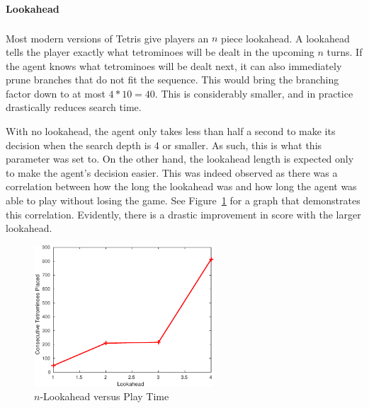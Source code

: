 \documentclass[fontsize=12pt]{article}
\def\tetris{Tetris\textsuperscript{\textregistered}}
\begin{document}
\paragraph{Lookahead}
\label{par:lookahead}
Most modern versions of \tetris{} give players an $n$ piece lookahead. A lookahead tells the player exactly what tetrominoes will be dealt in the upcoming $n$ turns. If the agent knows what tetrominoes will be dealt next, it can also immediately prune branches that do not fit the sequence. This would bring the branching factor down to at most $4 * 10 = 40$. This is considerably smaller, and in practice drastically reduces search time.

\par With no lookahead, the agent only takes less than half a second to make its decision when the search depth is 4 or smaller. As such, this is what this parameter was set to. On the other hand, the lookahead length is expected only to make the agent's decision easier. This was indeed observed as there was a correlation between how the long the lookahead was and how long the agent was able to play without losing the game. See Figure~\ref{fig:n_lookahead_vs_play_time} for a graph that demonstrates this correlation. Evidently, there is a drastic improvement in score with the larger lookahead.

\begin{figure}[H]
  \centering
  \includegraphics[width=0.6\textwidth]{figures/lookahead_v_time}
  \caption{$n$-Lookahead versus Play Time}
  \label{fig:n_lookahead_vs_play_time}
\end{figure}
\end{document}
